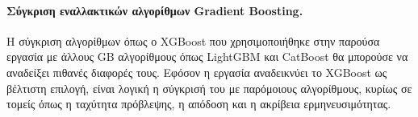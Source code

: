 \paragraph{Σύγκριση εναλλακτικών αλγορίθμων Gradient Boosting.}
Η σύγκριση αλγορίθμων όπως ο XGBoost που χρησιμοποιήθηκε στην παρούσα εργασία
με άλλους GB αλγορίθμους όπως LightGBM και CatBoost θα μπορούσε να αναδείξει
πιθανές διαφορές τους. Εφόσον η εργασία αναδεικνύει το XGBoost ως βέλτιστη
επιλογή, είναι λογική η σύγκρισή του με παρόμοιους αλγορίθμους, κυρίως σε
τομείς όπως η ταχύτητα πρόβλεψης, η απόδοση και η ακρίβεια ερμηνευσιμότητας.